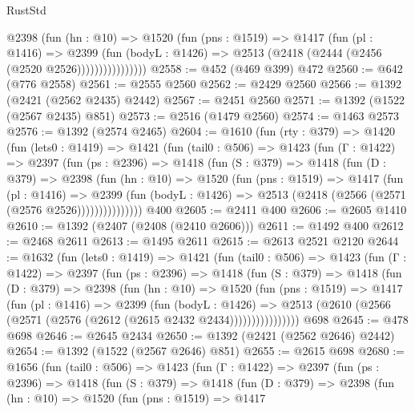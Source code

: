 \begin{lexlean}{RustStd}
\begin{coremodule}
                  @2398
                    (fun (hn : @10) =>
                    @1520
                      (fun (pns : @1519) =>
                      @1417
                        (fun (pl : @1416) =>
                        @2399
                          (fun (bodyL : @1426) =>
                          @2513 (@2418 (@2444 (@2456 (@2520 @2526))))))))))))))))
@2558 := @452 (@469 @399) @472
@2560 := @642 (@776 @2558)
@2561 := @2555 @2560
@2562 := @2429 @2560
@2566 := @1392 (@2421 (@2562 @2435) @2442)
@2567 := @2451 @2560
@2571 := @1392 (@1522 (@2567 @2435) @851)
@2573 := @2516 (@1479 @2560)
@2574 := @1463 @2573
@2576 := @1392 (@2574 @2465)
@2604 := @1610
    (fun (rty : @379) =>
    @1420
      (fun (lets0 : @1419) =>
      @1421
        (fun (tail0 : @506) =>
        @1423
          (fun (Γ : @1422) =>
          @2397
            (fun (ps : @2396) =>
            @1418
              (fun (S : @379) =>
              @1418
                (fun (D : @379) =>
                @2398
                  (fun (hn : @10) =>
                  @1520
                    (fun (pns : @1519) =>
                    @1417
                      (fun (pl : @1416) =>
                      @2399
                        (fun (bodyL : @1426) =>
                        @2513 (@2418 (@2566 (@2571 (@2576 @2526)))))))))))))))
    @400
@2605 := @2411 @400
@2606 := @2605 @1410
@2610 := @1392 (@2407 (@2408 (@2410 @2606)))
@2611 := @1492 @400
@2612 := @2468 @2611
@2613 := @1495 @2611
@2615 := @2613 @2521 @2120
@2644 := @1632
    (fun (lets0 : @1419) =>
    @1421
      (fun (tail0 : @506) =>
      @1423
        (fun (Γ : @1422) =>
        @2397
          (fun (ps : @2396) =>
          @1418
            (fun (S : @379) =>
            @1418
              (fun (D : @379) =>
              @2398
                (fun (hn : @10) =>
                @1520
                  (fun (pns : @1519) =>
                  @1417
                    (fun (pl : @1416) =>
                    @2399
                      (fun (bodyL : @1426) =>
                      @2513 (@2610 (@2566 (@2571 (@2576 (@2612 (@2615 @2432 @2434))))))))))))))))
    @698
@2645 := @478 @698
@2646 := @2645 @2434
@2650 := @1392 (@2421 (@2562 @2646) @2442)
@2654 := @1392 (@1522 (@2567 @2646) @851)
@2655 := @2615 @698
@2680 := @1656
    (fun (tail0 : @506) =>
    @1423
      (fun (Γ : @1422) =>
      @2397
        (fun (ps : @2396) =>
        @1418
          (fun (S : @379) =>
          @1418
            (fun (D : @379) =>
            @2398
              (fun (hn : @10) =>
              @1520
                (fun (pns : @1519) =>
                @1417

\end{coremodule}
\end{lexlean}
